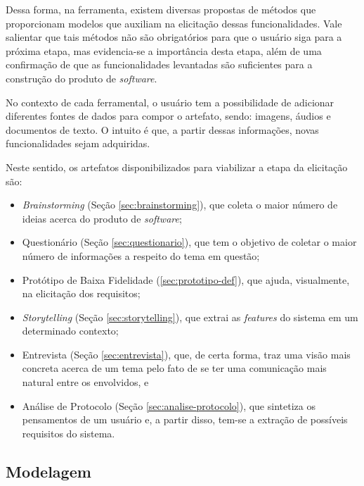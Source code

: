Dessa forma, na ferramenta, existem diversas propostas de métodos que proporcionam modelos que auxiliam na elicitação dessas funcionalidades. Vale salientar que tais métodos não são obrigatórios para que o usuário siga para a próxima etapa, mas evidencia-se a importância desta etapa, além de uma confirmação de que as funcionalidades levantadas são suficientes para a construção do produto de \textit{software}.

No contexto de cada ferramental, o usuário tem a possibilidade de adicionar diferentes fontes de dados para compor o artefato, sendo: imagens, áudios e documentos de texto. O intuito é que, a partir dessas informações, novas funcionalidades sejam adquiridas.



Neste sentido, os artefatos disponibilizados para viabilizar a etapa da elicitação são:

\begin{itemize}
    \item \textit{Brainstorming} (Seção \ref{sec:brainstorming}), que coleta o maior número de ideias acerca do produto de \textit{software};
    \item Questionário (Seção \ref{sec:questionario}), que tem o objetivo de coletar o maior número de informações a respeito do tema em questão;
    \item Protótipo de Baixa Fidelidade (\ref{sec:prototipo-def}), que ajuda, visualmente, na elicitação dos requisitos;
    \item \textit{Storytelling} (Seção \ref{sec:storytelling}), que extrai as \textit{features} do sistema em um determinado contexto;
    \item Entrevista (Seção \ref{sec:entrevista}), que, de certa forma, traz uma visão mais concreta acerca de um tema pelo fato de se ter uma comunicação mais natural entre os envolvidos, e
    \item Análise de Protocolo (Seção \ref{sec:analise-protocolo}), que sintetiza os pensamentos de um usuário e, a partir disso, tem-se a extração de possíveis requisitos do sistema.
\end{itemize}

\subsection{Modelagem}

